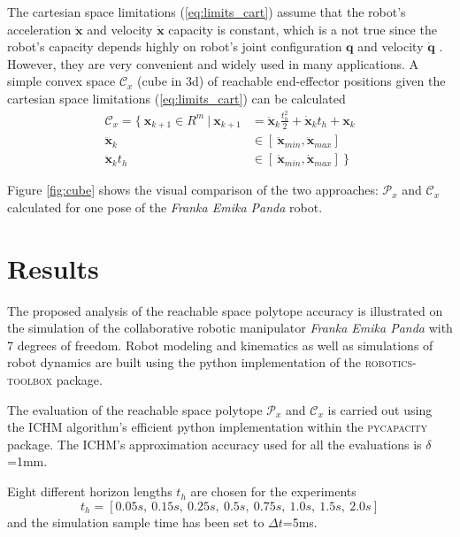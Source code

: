 The cartesian space limitations (\ref{eq:limits_cart}) assume that the robot's acceleration $\ddot{\bm{x}}$ and velocity $\dot{\bm{x}}$ capacity is constant, which is a not true since the robot's capacity depends highly on robot's joint configuration $\bm{q}$ and velocity  $\dot{\bm{q}}$ \cite{Bowling2005}\cite{skuric2021}. However, they are very convenient and widely used in many applications. A simple convex space $\mathcal{C}_x$ (cube in 3d) of reachable end-effector positions given the cartesian space limitations (\ref{eq:limits_cart}) can be calculated
\begin{equation}
\begin{split}
    \mathcal{C}_x = \{ ~\bm{x}_{k+1} \in R^m ~|~ \bm{x}_{k+1} &= \ddot{\bm{x}}_{k}\frac{t_h^2}{2} + \dot{\bm{x}}_kt_h + \bm{x}_k \\
    \ddot{\bm{x}}_{k} &\in [~ \ddot{\bm{x}}_{min},  \ddot{\bm{x}}_{max}]\\
    \ddot{\bm{x}}_{k}t_h &\in [~ \dot{\bm{x}}_{min},  \dot{\bm{x}}_{max}] ~\}
\end{split}
\end{equation}

Figure \ref{fig:cube} shows the visual comparison of the two approaches: $\mathcal{P}_x$ and $\mathcal{C}_x$ calculated for one pose of the \textit{Franka Emika Panda} robot. 


\section{Results}
\label{ch:results}

The proposed analysis of the reachable space polytope accuracy is illustrated on the simulation of the collaborative robotic manipulator \textit{Franka Emika Panda} with 7 degrees of freedom.
Robot modeling and kinematics as well as simulations of robot dynamics are built using the python implementation of the \textsc{robotics-toolbox}\cite{rtb} package. 

The evaluation of the reachable space polytope $\mathcal{P}_x$ and $\mathcal{C}_x$ is carried out using the ICHM algorithm's efficient python implementation within the \textsc{pycapacity}\cite{pycapacity} package. The ICHM's approximation accuracy used for all the evaluations is $\delta$=1mm.

Eight different horizon lengths $t_h$ are chosen for the experiments
$$
t_h = [0.05s, ~ 0.15s, ~ 0.25s, ~ 0.5s,~ 0.75s,~ 1.0s,~ 1.5s, ~ 2.0s]
$$
and the simulation sample time has been set to $\Delta t$=5ms. 

